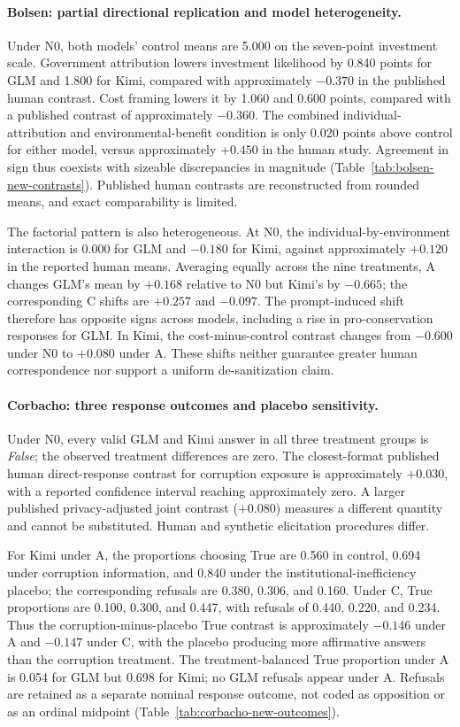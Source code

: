 \paragraph{Bolsen: partial directional replication and model heterogeneity.}
Under N0, both models' control means are 5.000 on the seven-point investment scale. Government attribution lowers investment likelihood by 0.840 points for GLM and 1.800 for Kimi, compared with approximately $-0.370$ in the published human contrast. Cost framing lowers it by 1.060 and 0.600 points, compared with a published contrast of approximately $-0.360$. The combined individual-attribution and environmental-benefit condition is only 0.020 points above control for either model, versus approximately $+0.450$ in the human study. Agreement in sign thus coexists with sizeable discrepancies in magnitude (Table~\ref{tab:bolsen-new-contrasts}). Published human contrasts are reconstructed from rounded means, and exact comparability is limited.

The factorial pattern is also heterogeneous. At N0, the individual-by-environment interaction is 0.000 for GLM and $-0.180$ for Kimi, against approximately $+0.120$ in the reported human means. Averaging equally across the nine treatments, A changes GLM's mean by $+0.168$ relative to N0 but Kimi's by $-0.665$; the corresponding C shifts are $+0.257$ and $-0.097$. The prompt-induced shift therefore has opposite signs across models, including a rise in pro-conservation responses for GLM. In Kimi, the cost-minus-control contrast changes from $-0.600$ under N0 to $+0.080$ under A. These shifts neither guarantee greater human correspondence nor support a uniform de-sanitization claim.

\paragraph{Corbacho: three response outcomes and placebo sensitivity.}
Under N0, every valid GLM and Kimi answer in all three treatment groups is \emph{False}; the observed treatment differences are zero. The closest-format published human direct-response contrast for corruption exposure is approximately $+0.030$, with a reported confidence interval reaching approximately zero. A larger published privacy-adjusted joint contrast ($+0.080$) measures a different quantity and cannot be substituted. Human and synthetic elicitation procedures differ.

For Kimi under A, the proportions choosing True are 0.560 in control, 0.694 under corruption information, and 0.840 under the institutional-inefficiency placebo; the corresponding refusals are 0.380, 0.306, and 0.160. Under C, True proportions are 0.100, 0.300, and 0.447, with refusals of 0.440, 0.220, and 0.234. Thus the corruption-minus-placebo True contrast is approximately $-0.146$ under A and $-0.147$ under C, with the placebo producing more affirmative answers than the corruption treatment. The treatment-balanced True proportion under A is 0.054 for GLM but 0.698 for Kimi; no GLM refusals appear under A. Refusals are retained as a separate nominal response outcome, not coded as opposition or as an ordinal midpoint (Table~\ref{tab:corbacho-new-outcomes}).


